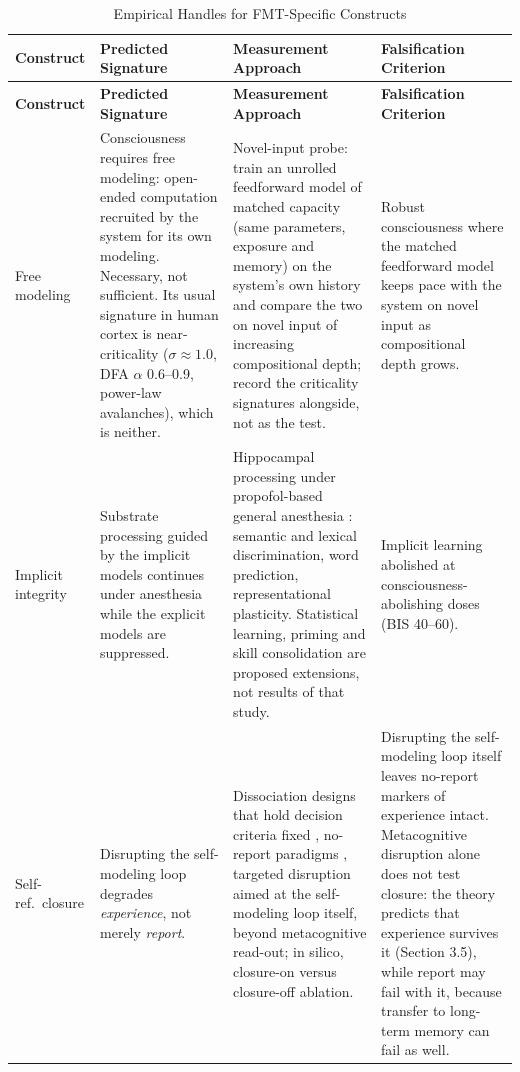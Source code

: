 \documentclass[12pt]{article}
\begin{document}
{{\renewcommand{\thetable}{1b}\footnotesize
\begin{xltabular}{\textwidth}{p{2.5cm}XXX}
\caption{Empirical Handles for FMT-Specific Constructs}\label{tab:empirical-handles}\\
\toprule
\textbf{Construct} & \textbf{Predicted Signature} & \textbf{Measurement Approach} & \textbf{Falsification Criterion} \\
\midrule
\endfirsthead
\toprule
\textbf{Construct} & \textbf{Predicted Signature} & \textbf{Measurement Approach} & \textbf{Falsification Criterion} \\
\midrule
\endhead
Free modeling & Consciousness requires free modeling: open-ended computation recruited by the system for its own modeling. Necessary, not sufficient. Its usual signature in human cortex is near-criticality ($\sigma \approx 1.0$, DFA $\alpha$ 0.6--0.9, power-law avalanches), which is neither. & Novel-input probe: train an unrolled feedforward model of matched capacity (same parameters, exposure and memory) on the system's own history and compare the two on novel input of increasing compositional depth; record the criticality signatures alongside, not as the test. & Robust consciousness where the matched feedforward model keeps pace with the system on novel input as compositional depth grows. \\
\midrule
Implicit integrity & Substrate processing guided by the implicit models continues under anesthesia while the explicit models are suppressed. & Hippocampal processing under propofol-based general anesthesia \citep{Katlowitz2026}: semantic and lexical discrimination, word prediction, representational plasticity. Statistical learning, priming and skill consolidation are proposed extensions, not results of that study. & Implicit learning abolished at consciousness-abolishing doses (BIS 40--60). \\
\midrule
Self-ref.\ closure & Disrupting the self-modeling loop degrades \emph{experience}, not merely \emph{report}. & Dissociation designs that hold decision criteria fixed \citep{Nakamura2026}, no-report paradigms \citep{Tsuchiya2015}, targeted disruption aimed at the self-modeling loop itself, beyond metacognitive read-out; in silico, closure-on versus closure-off ablation. & Disrupting the self-modeling loop itself leaves no-report markers of experience intact. Metacognitive disruption alone does not test closure: the theory predicts that experience survives it (Section 3.5), while report may fail with it, because transfer to long-term memory can fail as well. \\

\end{xltabular}}}
\end{document}

